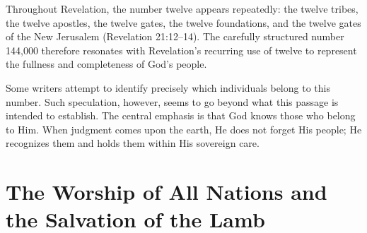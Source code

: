 Throughout Revelation, the number twelve appears repeatedly: the twelve tribes, the twelve apostles, the twelve gates, the twelve foundations, and the twelve gates of the New Jerusalem (Revelation 21:12--14). The carefully structured number 144,000 therefore resonates with Revelation's recurring use of twelve to represent the fullness and completeness of God's people.

Some writers attempt to identify precisely which individuals belong to this number. Such speculation, however, seems to go beyond what this passage is intended to establish. The central emphasis is that God knows those who belong to Him. When judgment comes upon the earth, He does not forget His people; He recognizes them and holds them within His sovereign care.

\section{The Worship of All Nations and the Salvation of the Lamb}


